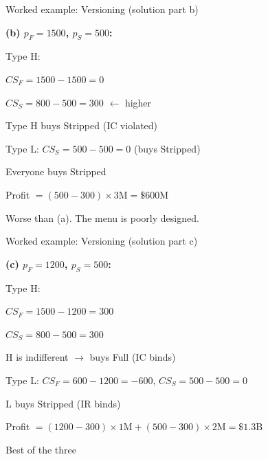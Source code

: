 \documentclass[notes,11pt, aspectratio=169]{beamer}
\newenvironment{wideitemize}{\itemize\addtolength{\itemsep}{10pt}}{\enditemize}
\begin{document}
\begin{frame}{Worked example: Versioning (solution part b)}
	\begin{wideitemize}
		\item \textbf{(b) $p_F = 1500$, $p_S = 500$:}
		\item Type H:
		\begin{wideitemize}
			\vspace{3pt}
			\item $CS_F = 1500 - 1500 = 0$
			\item $CS_S = 800 - 500 = 300$ $\leftarrow$ higher
		\end{wideitemize}
		\item Type H buys Stripped (IC violated)
		\item Type L: $CS_S = 500 - 500 = 0$ (buys Stripped)
		\item Everyone buys Stripped
		\item Profit $= (500 - 300) \times 3\text{M} = \$600\text{M}$
		\item Worse than (a). The menu is poorly designed.
	\end{wideitemize}
\end{frame}

\begin{frame}{Worked example: Versioning (solution part c)}
	\begin{wideitemize}
		\item \textbf{(c) $p_F = 1200$, $p_S = 500$:}
		\item Type H:
		\begin{wideitemize}
			\vspace{3pt}
			\item $CS_F = 1500 - 1200 = 300$
			\item $CS_S = 800 - 500 = 300$
		\end{wideitemize}
		\item H is indifferent $\rightarrow$ buys Full (IC binds)
		\item Type L: $CS_F = 600 - 1200 = -600$, $CS_S = 500 - 500 = 0$
		\item L buys Stripped (IR binds)
		\item Profit $= (1200 - 300) \times 1\text{M} + (500 - 300) \times 2\text{M} = \$1.3\text{B}$
		\item Best of the three
	\end{wideitemize}
\end{frame}
\end{document}
